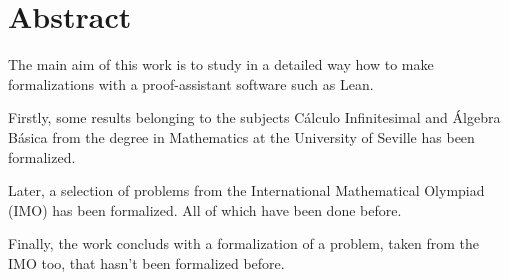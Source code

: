 \chapter*{Abstract}

The main aim of this work is to study in a detailed way how to make
formalizations with a proof-assistant software such as Lean.

Firstly, some results belonging to the subjects Cálculo Infinitesimal
and Álgebra Básica from the degree in Mathematics at the University of
Seville has been formalized.

Later, a selection of problems from the International Mathematical
Olympiad (IMO) has been formalized. All of which have been done before.

Finally, the work concluds with a formalization of a problem, taken from
the IMO too, that hasn't been formalized before.


